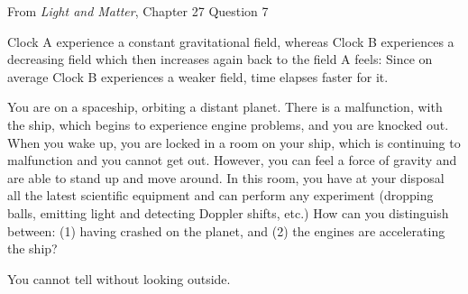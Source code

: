 \documentclass[12pt]{exam}
\begin{document}
\begin{questions}
	From \textit{Light and Matter}, Chapter 27 Question 7
	\begin{TheSolution}
	Clock A experience a constant gravitational field, whereas Clock B experiences a decreasing field which then increases again back to the field A feels: Since on average Clock B experiences a weaker field, time elapses faster for it.
	\end{TheSolution}
	
	\question You are on a spaceship, orbiting a distant planet. There is a malfunction, with the ship, which begins to experience engine problems, and you are knocked out. When you wake up, you are locked in a room on your ship, which is continuing to malfunction and you cannot get out. However, you can feel a force of gravity and are able to stand up and move around. In this room, you have at your disposal all the latest scientific equipment and can perform any experiment (dropping balls, emitting light and detecting Doppler shifts, etc.) How can you distinguish between: (1) having crashed on the planet, and (2) the engines are accelerating the ship?
	\begin{TheSolution}
	You cannot tell without looking outside.
	\end{TheSolution}

\end{questions}
\end{document}
